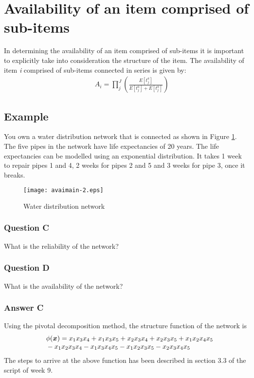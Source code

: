 \section{Availability of an item comprised of sub-items}
In determining the availability of an item comprised of sub-items it is
important to explicitly take into consideration the structure of the item. The
availability of item \textit{i} comprised of sub-items connected in series is
given by:
\begin{eqnarray}
&& {A_i} = \prod\limits_j^J {\left( {\frac{{E\left[ {t_j^a} \right]}}{{E\left[
{t_j^a} \right] + E\left[ {t_j^n} \right]}}} \right)}
\label{avaimaineq:3}
\end{eqnarray}
\subsection{Example}
You own a water distribution network that is connected as shown in Figure
\ref{avaimain:2}. The five pipes in the network have life expectancies of 20 years.
The life expectancies can be modelled using an exponential distribution. It takes
1 week to repair pipes 1 and 4, 2 weeks for pipes 2 and 5 and 3 weeks for pipe 3,
once it breaks.
\begin{figure}[h]
\texttt{[image: avaimain-2.eps]}
\caption{Water distribution network}\label{avaimain:2}
\end{figure}
\subsubsection{Question C}
What is the reliability of the network?
\subsubsection{Question D}
What is the availability of the network?
\subsubsection{Answer C}
Using the pivotal decomposition method, the structure function of the network is
\begin{eqnarray}
&& \begin{array}{l}
\phi (\vec x) = {x_1}{x_3}{x_4} + {x_1}{x_3}{x_5} + {x_2}{x_3}{x_4} +
{x_2}{x_3}{x_5} + {x_1}{x_2}{x_4}{x_5}\\
{\rm{          }} - {x_1}{x_2}{x_3}{x_4} - {x_1}{x_3}{x_4}{x_5} -
{x_1}{x_2}{x_3}{x_5} - {x_2}{x_3}{x_4}{x_5}
\end{array}
\label{avaimaineq:4}
\end{eqnarray}
The steps to arrive at the above function has been described in section 3.3 of
the script of week 9.

